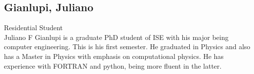 \subsection{Gianlupi, Juliano}
Residential Student\\
Juliano F Gianlupi is a graduate PhD student of ISE with his major being 
computer engineering. This is his first semester. He graduated in Physics and  
also has a Master in Physics with emphasis on computational physics. He has 
experience with FORTRAN and python, being more fluent in the latter.